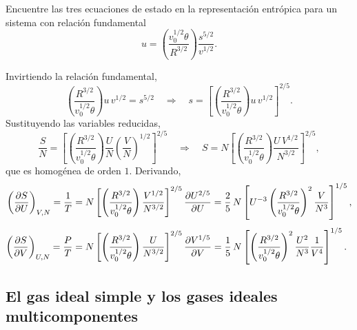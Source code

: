 \begin{ejercicio}
  Encuentre las tres ecuaciones de estado en la representación entrópica para un sistema con
  relación fundamental
  \begin{equation*}
    u=\left(\frac{v_0^{1/2}\theta}{R^{3/2}}\right)\frac{s^{5/2}}{v^{1/2}}.
  \end{equation*}
\end{ejercicio}

\begin{solucion}
  Invirtiendo la relación fundamental,
  \begin{equation*}
    \left(\frac{R^{3/2}}{v_0^{1/2}\theta}\right)u\,v^{1/2}=s^{5/2}
    \quad\Longrightarrow\quad
    s=\left[\left(\frac{R^{3/2}}{v_0^{1/2}\theta}\right)u\,v^{1/2}\right]^{2/5}.
  \end{equation*}
  Sustituyendo las variables reducidas,
  \begin{equation*}
    \frac{S}{N}=\left[\left(\frac{R^{3/2}}{v_0^{1/2}\theta}\right)\frac{U}{N}\left(\frac{V}{N}\right)^{1/2}\right]^{2/5}
    \quad\Longrightarrow\quad
    S=N\left[\left(\frac{R^{3/2}}{v_0^{1/2}\theta}\right)\frac{U\,V^{1/2}}{N^{3/2}}\right]^{2/5},
  \end{equation*}
  que es homogénea de orden $1$. Derivando,
  \begin{align*}
    \left(\frac{\partial S}{\partial U}\right)_{V,N}=\frac{1}{T}&=N\left[\left(\frac{R^{3/2}}{v_0^{1/2}\theta}\right)\frac{V^{1/2}}{N^{3/2}}\right]^{2/5}\pdv{U^{2/5}}{U}
      =\frac{2}{5}\,N\left[U^{-3}\left(\frac{R^{3/2}}{v_0^{1/2}\theta}\right)^{2}\frac{V}{N^{3}}\right]^{1/5},\\[4pt]
    \left(\frac{\partial S}{\partial V}\right)_{U,N}=\frac{P}{T}&=N\left[\left(\frac{R^{3/2}}{v_0^{1/2}\theta}\right)\frac{U}{N^{3/2}}\right]^{2/5}\pdv{V^{1/5}}{V}
      =\frac{1}{5}\,N\left[\left(\frac{R^{3/2}}{v_0^{1/2}\theta}\right)^{2}\frac{U^{2}}{N^{3}}\frac{1}{V^{4}}\right]^{1/5}.
  \end{align*}
\end{solucion}

\subsection*{El gas ideal simple y los gases ideales multicomponentes}


